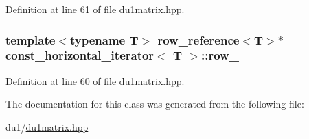 Definition at line 61 of file du1matrix.\-hpp.

\hypertarget{classconst__horizontal__iterator_a10b63a186970a5302dddcd56790ab9c8}{
\subsubsection[{row\-\_\-}]{\setlength{\rightskip}{0pt plus 5cm}template$<$typename T$>$ {\bf row\-\_\-reference}$<$T$>$$\ast$ {\bf const\-\_\-horizontal\-\_\-iterator}$<$ T $>$\-::row\-\_\-\hspace{0.3cm}{\ttfamily [protected]}}}\label{classconst__horizontal__iterator_a10b63a186970a5302dddcd56790ab9c8}


Definition at line 60 of file du1matrix.\-hpp.



The documentation for this class was generated from the following file\-:\begin{DoxyCompactItemize}
\item 
du1/\hyperlink{du1matrix_8hpp}{du1matrix.\-hpp}\end{DoxyCompactItemize}
